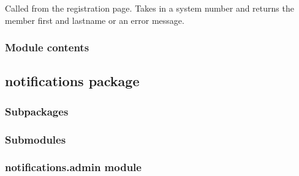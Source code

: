 \documentclass[letterpaper,10pt,english]{sphinxmanual}
\begin{document}

\begin{fulllineitems}
\label{\detokenize{masterpoints:masterpoints.views.system_number_lookup}}
Called from the registration page. Takes in a system number and returns
the member first and lastname or an error message.

\end{fulllineitems}



\subsubsection{Module contents}
\label{\detokenize{masterpoints:module-masterpoints}}\label{\detokenize{masterpoints:module-contents}}

\subsection{notifications package}
\label{\detokenize{notifications:notifications-package}}\label{\detokenize{notifications::doc}}

\subsubsection{Subpackages}
\label{\detokenize{notifications:subpackages}}

\subsubsection{Submodules}
\label{\detokenize{notifications:submodules}}

\subsubsection{notifications.admin module}
\label{\detokenize{notifications:module-notifications.admin}}\label{\detokenize{notifications:notifications-admin-module}}
\end{document}
